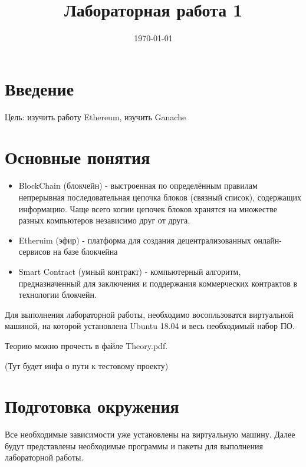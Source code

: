 \documentclass{article}
\begin{document}
\title{Лабораторная работа 1}

\date{\today}
\maketitle


\section{Введение}

Цель: изучить работу Ethereum, изучить Ganache


\section{Основные понятия}

\begin{itemize}
	\item BlockChain (блокчейн) - выстроенная по определённым правилам непрерывная последовательная цепочка блоков (связный список), содержащих информацию. Чаще всего копии цепочек блоков хранятся на множестве разных компьютеров независимо друг от друга. 
	\item Etheruim (эфир) -  платформа для создания децентрализованных онлайн-сервисов на базе блокчейна
	\item Smart Contract (умный контракт) - компьютерный алгоритм, предназначенный для заключения и поддержания коммерческих контрактов в технологии блокчейн. 	
\end{itemize}


Для выполнения лабораторной работы, необходимо восопльзоватся виртуальной машиной, на которой установлена Ubuntu 18.04 и весь необходимый набор ПО.

Теорию можно прочесть в файле Theory.pdf.

(Тут будет инфа о пути к тестовому проекту)


\section{Подготовка окружения}

Все необходимые зависимости уже установлены на виртуальную машину. Далее будут представлены необходимые программы и пакеты для выполнения лабораторной работы. 
\end{document}
